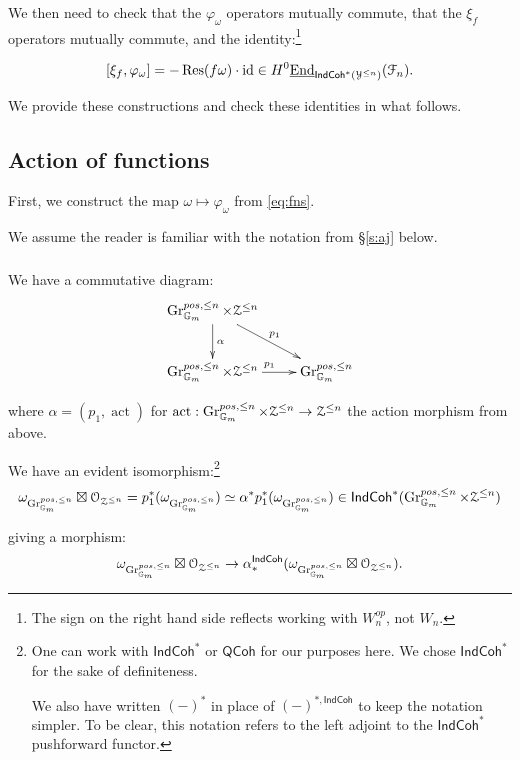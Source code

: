 \documentclass[reqno,11pt]{amsart}
\numberwithin{equation}{subsection}
\theoremstyle{remark}
\newcommand{\bG}{{\mathbb G}}
\newcommand{\sF}{{\EuScript F}}
\newcommand{\sO}{{\EuScript O}}
\newcommand{\sY}{{\EuScript Y}}
\newcommand{\sZ}{{\EuScript Z}}
\newcommand{\on}{\operatorname}
\newcommand{\ul}{\underline}
\newcommand{\End}{\on{End}}
\newcommand{\id}{\on{id}}
\newcommand{\act}{\on{act}}
\newcommand{\vph}{\varphi}
\newcommand{\Res}{\on{Res}}
\newcommand{\Gr}{\on{Gr}}
\newcommand{\IndCoh}{\mathsf{IndCoh}}
\newcommand{\QCoh}{\mathsf{QCoh}}
\begin{document}
\noindent We then need to check that the $\vph_{\omega}$ operators
mutually commute, that the $\xi_f$ operators mutually commute, and
the identity:\footnote{The sign on the right hand side reflects working
with $W_n^{op}$, not $W_n$.}

\begin{equation}\label{eq:uncertainty}
[\xi_f,\vph_{\omega}] = -\Res(f\omega) \cdot \id \in  
H^0\ul{\End}_{\IndCoh^*(\sY^{\leq n})}(\sF_n).
\end{equation}

We provide these constructions and check these identities in what follows.

\subsection{Action of functions}\label{ss:fn-intro}

First, we construct the map $\omega \mapsto \vph_{\omega}$ 
from \eqref{eq:fns}.

We assume the reader is familiar with the notation
from \S \ref{s:aj} below. 

\subsubsection{}\label{ss:fn-concl}

We have a commutative diagram:
%
\[
\xymatrix{
\Gr_{\bG_m}^{pos,\leq n} \times \sZ^{\leq n} \ar[d]^{\alpha}
 \ar[dr]^{p_1} 
& \\
\Gr_{\bG_m}^{pos,\leq n} \times \sZ^{\leq n} \ar[r]^{p_1}
& \Gr_{\bG_m}^{pos,\leq n}
}
\]

\noindent where $\alpha = (p_1,\act)$ for
$\act:\Gr_{\bG_m}^{pos,\leq n} \times \sZ^{\leq n} \to \sZ^{\leq n}$
the action morphism from above.

We have an evident isomorphism:\footnote{One can work with
$\IndCoh^*$ or $\QCoh$ for our purposes here. 
We chose
$\IndCoh^*$ for the sake of definiteness. 

We also have
written $(-)^*$ in place of $(-)^{*,\IndCoh}$ to keep
the notation simpler. To be clear, this notation refers to
the left adjoint to the $\IndCoh^*$ pushforward functor.}
%
\[
\omega_{\Gr_{\bG_m}^{pos,\leq n}} \boxtimes 
\sO_{\sZ^{\leq n}} = 
p_1^*(\omega_{\Gr_{\bG_m}^{pos,\leq n}}) \simeq
\alpha^*p_1^*(\omega_{\Gr_{\bG_m}^{pos,\leq n}}) \in 
\IndCoh^*(\Gr_{\bG_m}^{pos,\leq n} \times \sZ^{\leq n})
\]

\noindent giving a morphism:
%
\[
\omega_{\Gr_{\bG_m}^{pos,\leq n}} \boxtimes 
\sO_{\sZ^{\leq n}} \to 
\alpha_*^{\IndCoh}(\omega_{\Gr_{\bG_m}^{pos,\leq n}} \boxtimes 
\sO_{\sZ^{\leq n}}).
\]
\end{document}

